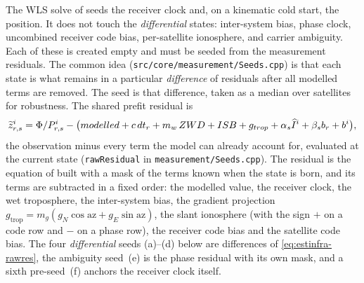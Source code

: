 \documentclass[main.tex]{subfiles}
\begin{document}
The WLS solve of  seeds the receiver clock and, on
a kinematic cold start, the position.  It does not touch the
\emph{differential} states: inter-system bias, phase clock, uncombined
receiver code bias, per-satellite ionosphere, and carrier ambiguity.
Each of these is created empty and must be seeded from the measurement
residuals.  The common idea
(\texttt{src/core/measurement/Seeds.cpp}) is that each state
is what remains in a particular \emph{difference} of residuals after all
modelled terms are removed.  The seed is that difference, taken as a
median over satellites for robustness.
The shared prefit residual is
\begin{equation}
\widetilde{z}_{r,s}^{i}
= \Phi/P_{r,s}^{i}
  - \bigl(modelled
  + c\,dt_r + m_w\,ZWD + ISB + g_{trop}
  + \alpha_s \widehat{I}^i + \beta_s b_r + b^i\bigr),
\label{eq:estinfra-rawres}
\end{equation}
the observation minus every term the model can already account for, evaluated
at the current state (\texttt{rawResidual} in \texttt{measurement/Seeds.cpp}).
The residual is the equation of  built with a mask of the terms known when the state is born, and
its terms are subtracted in a fixed order: the modelled value, the receiver
clock, the wet troposphere, the inter-system bias, the gradient projection
$g_{\mathrm{trop}} = m_g(g_N\cos\mathrm{az} + g_E\sin\mathrm{az})$, the slant
ionosphere (with the sign $+$ on a code row and $-$ on a phase row), the
receiver code bias and the satellite code bias.  The
four \emph{differential} seeds (a)--(d) below are
differences of \eqref{eq:estinfra-rawres}, the ambiguity seed~(e) is the
phase residual with its own mask, and a sixth pre-seed~(f)
anchors the receiver clock itself.
\end{document}
